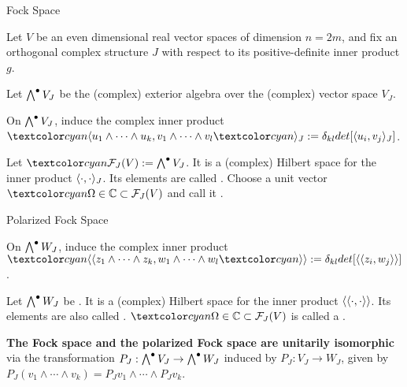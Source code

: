 \begin{frame}{Fock Space} %

    Let $V$ be an even dimensional real vector spaces of dimension $n = 2m$, and fix an orthogonal complex structure $J$ with respect to its positive-definite inner product $g$.
    
    Let $\bigwedge^\bullet V_J$ be the (complex) exterior algebra over the (complex) vector space $V_J$.
    
    On $\bigwedge^\bullet V_J$, induce the complex inner product $\defn{\bra} u_1 \wedge \cdots \wedge u_k, v_1 \wedge \cdots \wedge v_l \defn{\ket_J} := \delta_{kl} det[\bra u_i, v_j \ket_J]$.
    
    \begin{definition}
    Let  $\defn{\mathcal F_J(V)} := \extv_J$. It is a (complex) Hilbert space for the inner product $\langle \cdot, \cdot \rangle_J$. Its elements are called . Choose a unit vector $\defn{\Omega} \in \CC \subset \fjv$ and call it .
    \end{definition}

\end{frame}

\begin{frame}{Polarized Fock Space} %

    On $\bigwedge^\bullet W_J$, induce the complex inner product $\defn{\bbra} z_1 \wedge \cdots \wedge z_k, w_1 \wedge \cdots \wedge w_l \defn{\kket} := \delta_{kl} det[\bbra z_i, w_j \kket]$.
    
    \begin{definition}
    Let $\bigwedge^\bullet W_J$ be . It is a (complex) Hilbert space for the inner product $\langle\langle \cdot, \cdot \rangle\rangle$. Its elements are also called . $\defn{\Omega} \in \CC \subset \fjv$ is called a .
    \end{definition}
    
    \textbf{The Fock space and the polarized Fock space are unitarily isomorphic} via the transformation $P_J : \bigwedge^\bullet V_J \to \bigwedge^\bullet W_J$ induced by $P_J:V_J \to W_J$, given by $P_J(v_1 \wedge \cdots \wedge v_k) = P_Jv_1 \wedge \cdots \wedge P_Jv_k$.
    
\end{frame}

